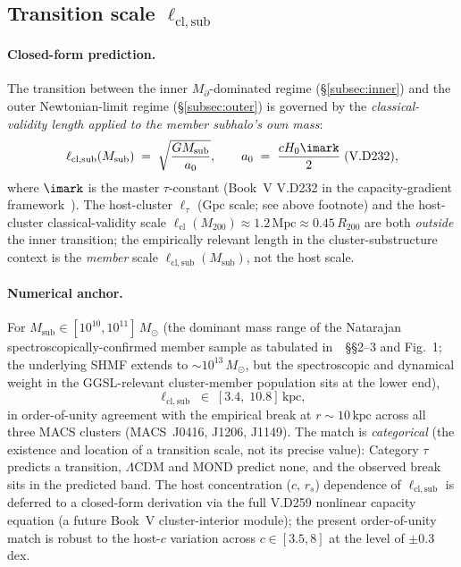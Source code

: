 \documentclass{pantarhei-researchnote}
\newcommand{\aMOND}{a_0}                        %
\newcommand{\ellcl}{\ell_{\mathrm{cl}}}         %
\newcommand{\ellsub}{\ell_{\mathrm{cl},\mathrm{sub}}}  %
\newcommand{\elltauv}{\ell_\tau}                %
\newcommand{\Mpa}{M_{\partial}}                 %
\newcommand{\Msub}{M_{\mathrm{sub}}}
\newcommand{\Mtwohun}{M_{200}}
\newcommand{\Rtwohun}{R_{200}}
\newcommand{\Mpc}{\mathrm{Mpc}}
\newcommand{\kpc}{\mathrm{kpc}}
\newcommand{\Msun}{M_{\odot}}
\begin{document}
\subsection{Transition scale \texorpdfstring{$\ellsub$}{l\_cl,sub}}\label{subsec:transition}

\paragraph{Closed-form prediction.}
The transition between the inner $\Mpa$-dominated regime
(\S\ref{subsec:inner}) and the outer Newtonian-limit regime
(\S\ref{subsec:outer}) is governed by the
\emph{classical-validity length applied to the member subhalo's own mass}:
\begin{equation}\label{eq:ellsub}
  \ellsub(\Msub) \;=\; \sqrt{\frac{G \Msub}{\aMOND}},
  \qquad \aMOND \;=\; \frac{c H_0 \imark}{2}\;\text{(V.D232)},
\end{equation}
where $\imark$ is the master $\tau$-constant (Book~V V.D232 in
the capacity-gradient framework~\cite{KSZCategorical}). The host-cluster
$\elltauv$ (Gpc scale; see above footnote) and the host-cluster classical-validity scale
$\ellcl(\Mtwohun) \approx 1.2\,\Mpc \approx 0.45\,\Rtwohun$ are both
\emph{outside} the inner transition; the empirically relevant length
in the cluster-substructure context is the \emph{member} scale
$\ellsub(\Msub)$, not the host scale.

\paragraph{Numerical anchor.}
For $\Msub \in [10^{10}, 10^{11}]\,\Msun$ (the dominant mass range of
the Natarajan spectroscopically-confirmed member sample as tabulated
in~\cite{Natarajan2026}~\S\S{}2--3 and Fig.~1; the underlying SHMF
extends to $\sim 10^{13}\,\Msun$, but the spectroscopic and dynamical
weight in the GGSL-relevant cluster-member population sits at the lower
end),
\[
  \ellsub \;\in\; [3.4,\; 10.8]\,\kpc,
\]
in order-of-unity agreement with the empirical break at $r \sim 10\,\kpc$
across all three MACS clusters (MACS~J0416, J1206, J1149). The match is
\emph{categorical} (the existence and location of a transition scale,
not its precise value): Category $\tau$ predicts a transition, $\Lambda$CDM
and MOND predict none, and the observed break sits in the predicted
band. The host concentration ($c$, $r_s$) dependence of $\ellsub$ is
deferred to a closed-form derivation via the full V.D259 nonlinear
capacity equation (a future Book~V cluster-interior module); the
present order-of-unity match is robust to the host-$c$ variation across
$c \in [3.5, 8]$ at the level of $\pm 0.3\,$dex.
\end{document}
